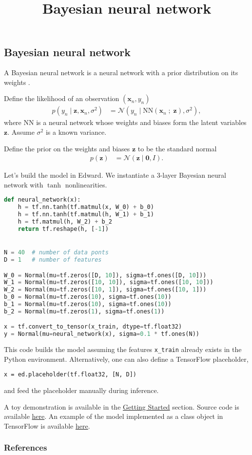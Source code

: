 \title{Bayesian neural network}

\subsection{Bayesian neural network}

A Bayesian neural network is a neural network with a prior
distribution on its weights \citep{neal2012bayesian}.

Define the likelihood of an observation $(\mathbf{x}_n, y_n)$
\begin{align*}
  p(y_n \mid \mathbf{z}, \mathbf{x}_n, \sigma^2)
  &=
  \mathcal{N}(y_n \mid \mathrm{NN}(\mathbf{x}_n\;;\;\mathbf{z}), \sigma^2),
\end{align*}
where $\mathrm{NN}$ is a neural network whose weights and biases form
the latent variables $\mathbf{z}$. Assume $\sigma^2$ is a
known variance.

Define the prior on the weights and biases $\mathbf{z}$ to be the standard normal
\begin{align*}
  p(\mathbf{z})
  &=
  \mathcal{N}(\mathbf{z} \mid \mathbf{0}, I).
\end{align*}

Let's build the model in Edward. We
instantiate a 3-layer Bayesian neural network with $\tanh$
nonlinearities.
\begin{lstlisting}[language=Python]
def neural_network(x):
    h = tf.nn.tanh(tf.matmul(x, W_0) + b_0)
    h = tf.nn.tanh(tf.matmul(h, W_1) + b_1)
    h = tf.matmul(h, W_2) + b_2
    return tf.reshape(h, [-1])


N = 40  # number of data ponts
D = 1   # number of features

W_0 = Normal(mu=tf.zeros([D, 10]), sigma=tf.ones([D, 10]))
W_1 = Normal(mu=tf.zeros([10, 10]), sigma=tf.ones([10, 10]))
W_2 = Normal(mu=tf.zeros([10, 1]), sigma=tf.ones([10, 1]))
b_0 = Normal(mu=tf.zeros(10), sigma=tf.ones(10))
b_1 = Normal(mu=tf.zeros(10), sigma=tf.ones(10))
b_2 = Normal(mu=tf.zeros(1), sigma=tf.ones(1))

x = tf.convert_to_tensor(x_train, dtype=tf.float32)
y = Normal(mu=neural_network(x), sigma=0.1 * tf.ones(N))
\end{lstlisting}
This code builds the model assuming the features \texttt{x\_train}
already exists in the Python environment. Alternatively, one can also
define a TensorFlow placeholder,
\begin{lstlisting}
x = ed.placeholder(tf.float32, [N, D])
\end{lstlisting}
and feed the placeholder manually during inference.

A toy demonstration is available in the \href{/getting-started}{Getting Started} section.
Source code is available
\href{https://github.com/blei-lab/edward/blob/master/examples/bayesian_nn.py}
{here}.
An example of the model implemented as a class object in TensorFlow is
available
\href{https://github.com/blei-lab/edward/blob/master/examples/tf_bayesian_nn.py}
{here}.

\subsubsection{References}\label{references}
